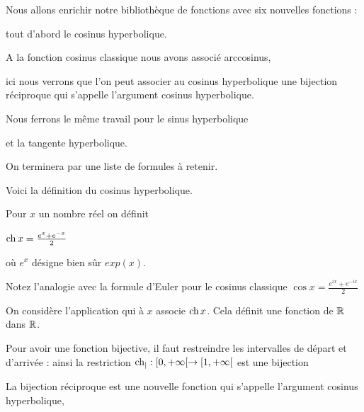 







\debuttexte

\diapo

\change

Nous allons enrichir notre bibliothèque de fonctions avec
six nouvelles fonctions :

\change

tout d'abord le cosinus hyperbolique.


A la fonction cosinus classique nous avons associé arccosinus,

ici nous verrons que l'on peut associer au cosinus hyperbolique 
une bijection réciproque qui s'appelle l'argument cosinus hyperbolique.

\change

Nous ferrons le même travail pour le sinus hyperbolique

\change

et la tangente hyperbolique.

\change

On terminera par une liste de formules à retenir.




\diapo

Voici la définition du cosinus hyperbolique.

Pour $x$ un nombre réel on définit 

$\mathop{\mathrm{ch}}\nolimits x = \frac{e^x+e^{-x}}{2}$

où $e^x$ désigne bien sûr $exp(x)$.

Notez l'analogie avec la formule d'Euler 
pour le cosinus classique 
$\cos x = \frac{e^{ix}+e^{-ix}}{2}$


\change

On considère l'application qui à $x$ associe $\mathop{\mathrm{ch}}\nolimits x$. Cela définit une fonction de $\mathbb{R}$ dans $\mathbb{R}$.

Pour avoir une fonction bijective, il faut restreindre les intervalles
de départ et d'arrivée :
ainsi la restriction $\mathop{\mathrm{ch}}\nolimits_| : [0,+\infty[ \to [1,+\infty[$ est une bijection

\change

La bijection réciproque est une nouvelle fonction qui s'appelle l'argument cosinus hyperbolique, 

